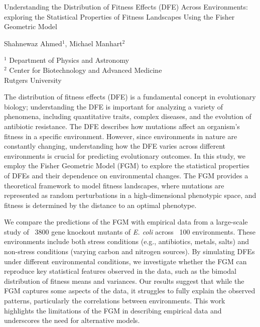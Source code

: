 \documentclass[a4paper]{article}
\begin{document}

\Large
 \begin{center}
 Understanding the Distribution of Fitness Effects (DFE) Across Environments: exploring the Statistical Properties of Fitness Landscapes Using the Fisher Geometric Model\\
\hspace{10pt}

\large
Shahnewaz Ahmed$^1$, Michael Manhart$^2$ \\

\hspace{10pt}

\small  
$^1$ Department of Physics and Astronomy\\
$^2$ Center for Biotechnology and Advanced Medicine \\
Rutgers University

\end{center}

\hspace{10pt}

\normalsize

The distribution of fitness effects (DFE) is a fundamental concept in evolutionary biology; understanding the DFE is important for analyzing a variety of phenomena, including quantitative traits, complex diseases, and the evolution of antibiotic resistance. The DFE describes how mutations affect an organism's fitness in a specific environment. However, since environments in nature are constantly changing, understanding how the DFE varies across different environments is crucial for predicting evolutionary outcomes. In this study, we employ the Fisher Geometric Model (FGM) to explore the statistical properties of DFEs and their dependence on environmental changes. The FGM provides a theoretical framework to model fitness landscapes, where mutations are represented as random perturbations in a high-dimensional phenotypic space, and fitness is determined by the distance to an optimal phenotype.

We compare the predictions of the FGM with empirical data from a large-scale study of ~3800 gene knockout mutants of \textit{E. coli} across ~100 environments. These environments include both stress conditions (e.g., antibiotics, metals, salts) and non-stress conditions (varying carbon and nitrogen sources). By simulating DFEs under different environmental conditions, we investigate whether the FGM can reproduce key statistical features observed in the data, such as the bimodal distribution of fitness means and variances. Our results suggest that while the FGM captures some aspects of the data, it struggles to fully explain the observed patterns, particularly the correlations between environments. This work highlights the limitations of the FGM in describing empirical data and underscores the need for alternative models.
\end{document}
